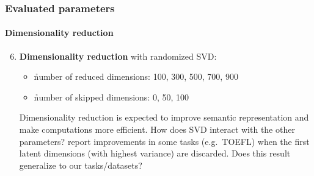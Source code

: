\documentclass[t]{beamer} %
\begin{document}
\begin{frame}
  \frametitle{Evaluated parameters}
  \framesubtitle{Dimensionality reduction}    

  \begin{enumerate}
    \setcounter{enumi}{5}
  \item \textbf{Dimensionality reduction} with randomized SVD:
    \begin{itemize}
    \item \h{number of reduced dimensions}: 100, 300, 500, 700, 900
    \item \h{number of skipped dimensions}: 0, 50, 100
    \end{itemize}    
    \begin{block}{}\small
      Dimensionality reduction is expected to improve semantic representation and make computations more efficient. How does SVD interact with the other parameters?
      \citet{Bullinaria:Levy:12} report improvements in some tasks (e.g.\ TOEFL) when the first latent dimensions (with highest variance) are discarded. Does this result generalize to our tasks/datasets? 
    \end{block}                  
  \end{enumerate}   
\end{frame}
\end{document}
